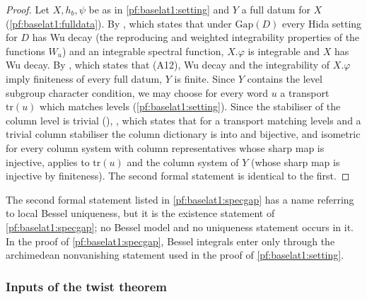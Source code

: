 \begin{proof}
Let $X,h_b,\psi$ be as in \cref{pf:baselat1:setting} and $Y$ a full datum for $X$ (\cref{pf:baselat1:fulldata}). By
, which states that under $\mathrm{Gap}(D)$ every Hida setting
for $D$ has Wu decay (the reproducing and weighted integrability properties of the functions $W_u$) and an integrable
spectral function, $X.\varphi$ is integrable and $X$ has Wu decay. By
, which states that (A12), Wu decay and the integrability of
$X.\varphi$ imply finiteness of every full datum, $Y$ is finite. Since $Y$ contains the level subgroup character condition, we may choose for every word $u$ a
transport $\mathrm{tr}(u)$ which matches levels (\cref{pf:baselat1:setting}). Since the stabiliser of the column
level is trivial (), ,
which states that for a transport matching levels and a trivial column stabiliser the column dictionary is into and
bijective, and isometric for every column system with column representatives whose sharp map is injective, applies
to $\mathrm{tr}(u)$ and the column system of $Y$ (whose sharp map is injective by finiteness). The second formal
statement is identical to the first.
\end{proof}

\begin{remark}\label{pf:baselat1:rem:bessel}
The second formal statement listed in \cref{pf:baselat1:specgap} has a name referring to local Bessel uniqueness,
but it is the existence statement of \cref{pf:baselat1:specgap}; no Bessel model and no uniqueness statement occurs in
it. In the proof of \cref{pf:baselat1:specgap}, Bessel integrals enter only through the archimedean nonvanishing
statement used in the proof of \cref{pf:baselat1:setting}.
\end{remark}

\subsubsection{Inputs of the twist theorem}\label{pf:baselat1:sssec:inputproofs}

